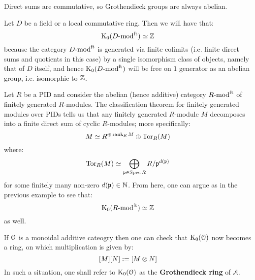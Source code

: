             \begin{example}
                Direct sums are commutative, so Grothendieck groups are always abelian. 
            \end{example}
            \begin{example}
                Let $D$ be a field or a local commutative ring. Then we will have that:
                    $$\mathrm{K}_0(D\text{-}\mathrm{mod}^{\mathrm{ft}}) \simeq \mathbb{Z}$$
                because the category $D\text{-}\mathrm{mod}^{\mathrm{ft}}$ is generated via finite colimits (i.e. finite direct sums and quotients in this case) by a single isomorphism class of objects, namely that of $D$ itself, and hence $\mathrm{K}_0(D\text{-}\mathrm{mod}^{\mathrm{ft}})$ will be free on $1$ generator as an abelian group, i.e. isomorphic to $\mathbb{Z}$.  
            \end{example}
            \begin{example}
                Let $R$ be a PID and consider the abelian (hence additive) category $R\text{-}\mathrm{mod}^{\mathrm{ft}}$ of finitely generated $R$-modules. The classification theorem for finitely generated modules over PIDs tells us that any finitely generated $R$-module $M$ decomposes into a finite direct sum of cyclic $R$-modules; more specifically:
                    $$M \simeq R^{\oplus \operatorname{rank}_R M} \oplus \mathrm{Tor}_R(M)$$
                where:
                    $$\mathrm{Tor}_R(M) \simeq \bigoplus_{\mathfrak{p} \in \operatorname{Spec} R} R/\mathfrak{p}^{d(\mathfrak{p})}$$
                for some finitely many non-zero $d(\mathfrak{p}) \in \mathbb{N}$. From here, one can argue as in the previous example to see that:
                    $$\mathrm{K}_0(R\text{-}\mathrm{mod}^{\mathrm{ft}}) \simeq \mathbb{Z}$$
                as well.
            \end{example}
            \begin{definition}
                If $\mathcal{O}$ is a monoidal additive cateogry then one can check that $\mathrm{K}_0(\mathcal{O})$ now becomes a ring, on which multiplication is given by:
                    $$[M] [N] := [M \tensor N]$$
                In such a situation, one shall refer to $\mathrm{K}_0(\mathcal{O})$ as the \textbf{Grothendieck ring} of $\mathcal{A}$.
            \end{definition}
